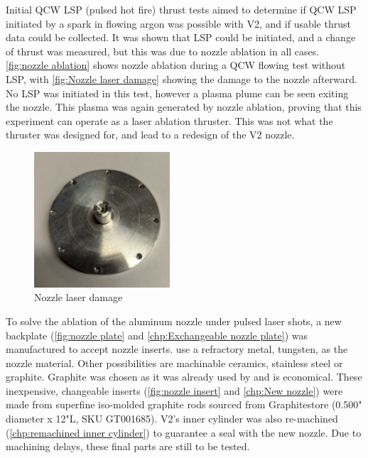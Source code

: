 Initial QCW LSP (pulsed hot fire) thrust tests aimed to determine if QCW LSP initiated by a spark in flowing argon was possible with V2, and if usable thrust data could be collected. It was shown that LSP could be initiated, and a change of thrust was measured, but this was due to nozzle ablation in all cases. \autoref{fig:nozzle ablation} shows nozzle ablation during a QCW flowing test without LSP, with \autoref{fig:Nozzle laser damage} showing the damage to the nozzle afterward. No LSP was initiated in this test, however a plasma plume can be seen exiting the nozzle. This plasma was again generated by nozzle ablation, proving that this experiment can operate as a laser ablation thruster. This was not what the thruster was designed for, and lead to a redesign of the V2 nozzle.

\begin{figure}[!ht]
    \centering
    \includegraphics[width=0.45\textwidth]{assets/4 experiments/Nozzle damage.jpg}
    \caption{Nozzle laser damage}
    \label{fig:Nozzle laser damage}
\end{figure}

To solve the ablation of the aluminum nozzle under pulsed laser shots, a new backplate (\autoref{fig:nozzle plate} and \autoref{chp:Exchangeable nozzle plate}) was manufactured to accept nozzle inserts. \textcite{toyodaThrustPerformanceCW2002} use a refractory metal, tungsten, as the nozzle material. Other possibilities are machinable ceramics, stainless steel or graphite. Graphite was chosen as it was already used by \textcite{shojiLaserheatedRocketThruster1977} and is economical. These inexpensive, changeable inserts (\autoref{fig:nozzle insert} and \autoref{chp:New nozzle}) were made from superfine iso-molded graphite rods sourced from Graphitestore (0.500" diameter x 12"L, SKU GT001685). V2's inner cylinder was also re-machined (\autoref{chp:remachined inner cylinder}) to guarantee a seal with the new nozzle. Due to machining delays, these final parts are still to be tested.

